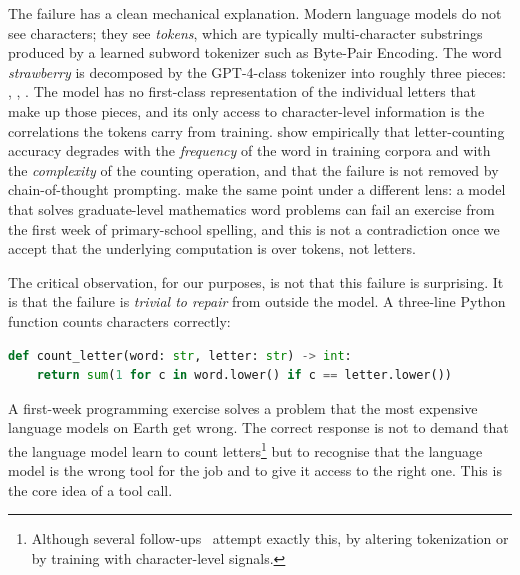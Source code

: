 The failure has a clean mechanical explanation. Modern language
models do not see characters; they see \emph{tokens}, which are
typically multi-character substrings produced by a learned subword
tokenizer such as Byte-Pair Encoding. The word \emph{strawberry} is
decomposed by the GPT-4-class tokenizer into roughly three pieces:
, , . The model has no first-class
representation of the individual letters that make up those pieces,
and its only access to character-level information is the
correlations the tokens carry from training. \citet{fu2024counting}
show empirically that letter-counting accuracy degrades with the
\emph{frequency} of the word in training corpora and with the
\emph{complexity} of the counting operation, and that the failure is
not removed by chain-of-thought prompting. \citet{xu2024geniusparadox}
make the same point under a different lens: a model that solves
graduate-level mathematics word problems can fail an exercise from
the first week of primary-school spelling, and this is not a
contradiction once we accept that the underlying computation is over
tokens, not letters.

The critical observation, for our purposes, is not that this failure
is surprising. It is that the failure is \emph{trivial to repair} from
outside the model. A three-line Python function counts characters
correctly:

\begin{lstlisting}[language=Python,caption={A reliable letter counter.},label=lst:counter]
def count_letter(word: str, letter: str) -> int:
    return sum(1 for c in word.lower() if c == letter.lower())
\end{lstlisting}

\noindent
A first-week programming exercise solves a problem that the most
expensive language models on Earth get wrong. The correct response
is not to demand that the language model learn to count
letters\footnote{Although several follow-ups~\citep{xu2024geniusparadox}
attempt exactly this, by altering tokenization or by training with
character-level signals.} but to recognise that the language model is
the wrong tool for the job and to give it access to the right one.
This is the core idea of a tool call.

